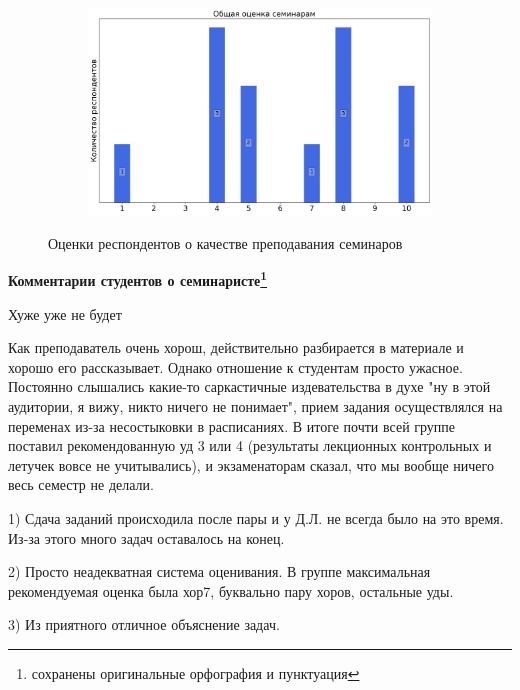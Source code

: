 \begin{figure}[H]
\begin{subfigure}[b]{0.45\textwidth}
			\end{subfigure}
			\begin{subfigure}[b]{0.45\textwidth}
				\centering
				\includegraphics[width=\textwidth]{images/3 course/Теория поля/seminarists-marks-Осипов Д.Л.-3.png}
			\end{subfigure}	
			\caption{Оценки респондентов о качестве преподавания семинаров}
		\end{figure}

		\textbf{Комментарии студентов о семинаристе\protect\footnote{сохранены оригинальные орфография и пунктуация}}
            \begin{commentbox} 
                Хуже уже не будет 
            \end{commentbox} 
        
            \begin{commentbox} 
                Как преподаватель очень хорош, действительно разбирается в материале и хорошо его рассказывает. Однако отношение к студентам просто ужасное. Постоянно слышались какие-то саркастичные издевательства в духе "ну в этой аудитории, я вижу, никто ничего не понимает", прием задания осуществлялся на переменах из-за несостыковки в расписаниях. В итоге почти всей группе поставил рекомендованную уд 3 или 4 (результаты лекционных контрольных и летучек вовсе не учитывались), и экзаменаторам сказал, что мы вообще ничего весь семестр не делали. 
            \end{commentbox} 
        
            \begin{commentbox} 
                1) Сдача заданий происходила после пары и у Д.Л. не всегда было на это время. Из-за этого много задач оставалось на конец.

                2) Просто неадекватная система оценивания. В группе максимальная рекомендуемая оценка была хор7, буквально пару хоров, остальные уды.

                3) Из приятного отличное объяснение задач.  
            \end{commentbox} 
        

